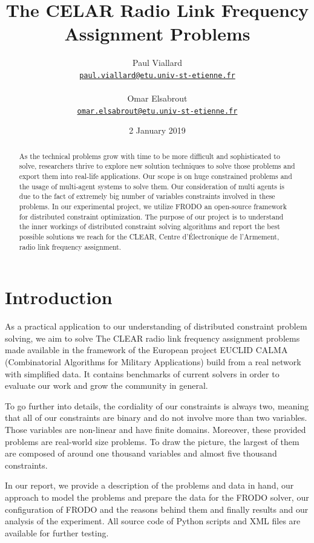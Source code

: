 \documentclass{article}
\title{The CELAR Radio Link Frequency Assignment Problems}
\author{Paul Viallard\\
	\texttt{\href{mailto:paul.viallard@etu.univ-st-etienne.fr}{paul.viallard@etu.univ-st-etienne.fr}} 
	\\\\ Omar Elsabrout\\
	\texttt{\href{mailto:omar.elsabrout@etu.univ-st-etienne.fr}{omar.elsabrout@etu.univ-st-etienne.fr}}}
\date{2 January 2019}
\begin{document}
	\maketitle
	
	\begin{abstract}
		As the technical problems grow with time to be more difficult and sophisticated to solve, researchers thrive to explore new solution techniques to solve those problems and export them into real-life applications. Our scope is on huge constrained problems and the usage of multi-agent systems to solve them. Our consideration of multi agents is due to the fact of extremely big number of variables constraints involved in these problems. In our experimental project, we utilize FRODO\cite{FRODO} an open-source framework for distributed constraint optimization. The purpose of our project is to understand the inner workings of distributed constraint solving algorithms and report the best possible solutions we reach for the CLEAR, Centre d’Électronique de l’Armement, radio link frequency assignment.
	\end{abstract}
	
	\section{Introduction}
	As a practical application to our understanding of distributed constraint problem solving, we aim to solve The CLEAR radio link frequency assignment problems made available in the framework of the European project EUCLID CALMA (Combinatorial Algorithms for Military Applications) build from a real network with simplified data. It contains benchmarks of current solvers in order to evaluate our work and grow the community in general.
	
	To go further into details, the cordiality of our constraints is always two, meaning that all of our constraints are binary and do not involve more than two variables. Those variables are non-linear and have finite domains. Moreover, these provided problems are real-world size problems. To draw the picture, the largest of them are composed of around one thousand variables and almost five thousand constraints.
	
	In our report, we provide a description of the problems and data in hand, our approach to model the problems and prepare the data for the FRODO solver, our configuration of FRODO and the reasons behind them and finally results and our analysis of the experiment. All source code of Python scripts and XML files are available for further testing.
	
\end{document}
